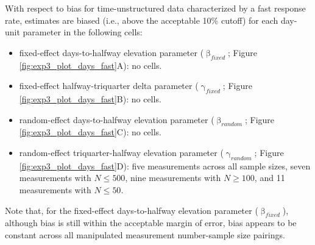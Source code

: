 \documentclass[
12pt, %
twoside,
english]{guelphthesis}
\begin{document}
With respect to bias for time-unstructured data characterized by a fast response rate, estimates are biased (i.e., above the acceptable 10\% cutoff) for each day-unit parameter in the following cells:
\begin{itemize}
\tightlist
\item
  fixed-effect days-to-halfway elevation parameter (\(\upbeta_{fixed}\); Figure \ref{fig:exp3_plot_days_fast}A): no cells.
\item
  fixed-effect halfway-triquarter delta parameter (\(\upgamma_{fixed}\); Figure \ref{fig:exp3_plot_days_fast}B): no cells.
\item
  random-effect days-to-halfway elevation parameter (\(\upbeta_{random}\); Figure \ref{fig:exp3_plot_days_fast}C): no cells.
\item
  random-effect triquarter-halfway elevation parameter (\(\upgamma_{random}\); Figure \ref{fig:exp3_plot_days_fast}D): five measurements across all sample sizes, seven measurements with \(N \le 500\), nine measurements with \(N \ge 100\), and 11 measurements with \(N \le 50\).
\end{itemize}
\noindent Note that, for the fixed-effect days-to-halfway elevation parameter (\(\upbeta_{fixed}\)), although bias is still within the acceptable margin of error, bias appears to be constant across all manipulated measurement number-sample size pairings.
\end{document}
